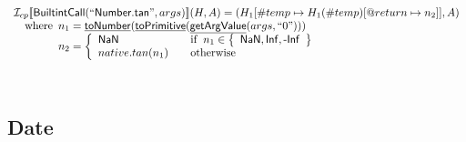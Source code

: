 \documentclass{article}
\newcommand{\SF}[1]{\mbox{\textsf{#1}}}
\newcommand{\wherec}[1]{{\rm where}\begin{array}[t]{l}#1\end{array}}
\newcommand{\ifc}[1]{{\rm if}\begin{array}[t]{l}#1\end{array}}
\newcommand{\owc}{{\rm otherwise}}
\newcommand{\I}{\mathcal{I}}
\newcommand{\set}[1]{\left\{\begin{array}{l}#1\end{array}\right\}}
\newcommand{\lbr}{\llbracket}
\newcommand{\rbr}{\rrbracket}
\newcommand{\hf}[1]{\underline{\sf #1}}
\begin{document}
\[\begin{array}{l}
\I _{cp}\lbr \SF{BuiltintCall}(``\SF{Number.tan}",args)\rbr(H,A)
  = (H_1[\#temp \mapsto H_1(\#temp)[@return \mapsto n_2]], A)\\
\quad\wherec{
  n_1 = \hf{toNumber}(\hf{toPrimitive}(\hf{getArgValue}(args, ``0")))\\
  n_2 = \left\{
    \begin{array}{l@{\quad\quad}l}
      \SF{NaN} & \ifc{n_1 \in \set{\SF{NaN}, \SF{Inf}, \SF{-Inf}}}\\
      native.tan(n_1) & \owc 
    \end{array}
  \right.
  }\\
\\\\

\end{array}
\]
\subsection{Date}
\end{document}
